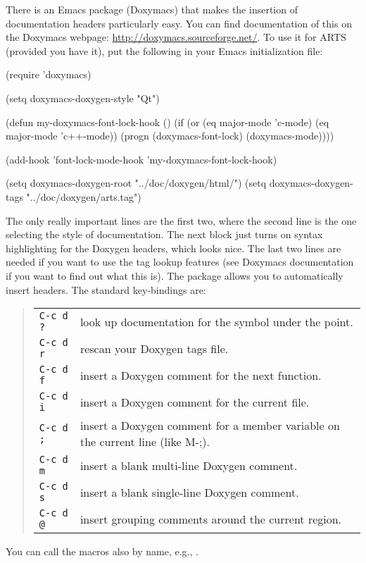 There is an Emacs package (Doxymacs) that makes the insertion of
documentation headers particularly easy. You can find documentation of
this on the Doxymacs webpage: \url{http://doxymacs.sourceforge.net/}.
To use it for ARTS (provided you have it), put the following in your
Emacs initialization file:

\begin{code}
(require 'doxymacs)

(setq doxymacs-doxygen-style "Qt")

(defun my-doxymacs-font-lock-hook ()
  (if (or (eq major-mode 'c-mode) (eq major-mode 'c++-mode))
      (progn
        (doxymacs-font-lock)
        (doxymacs-mode))))

(add-hook 'font-lock-mode-hook 'my-doxymacs-font-lock-hook)

(setq doxymacs-doxygen-root "../doc/doxygen/html/")
(setq doxymacs-doxygen-tags "../doc/doxygen/arts.tag")
\end{code}

The only really important lines are the first two, where the second
line is the one selecting the style of documentation. The next block
just turns on syntax highlighting for the Doxygen headers, which looks
nice. The last two lines are needed if you want to use the tag lookup
features (see Doxymacs documentation if you want to find out what this
is).  The package allows you to automatically insert headers. The
standard key-bindings are:
\begin{quote}
\begin{tabularx}{.8\hsize}{@{}lX}
\texttt{C-c d ?} & look up documentation for the symbol under the point.\\
\texttt{C-c d r} & rescan your Doxygen tags file.\\
\texttt{C-c d f} & insert a Doxygen comment for the next function.\\
\texttt{C-c d i} & insert a Doxygen comment for the current file.\\
\texttt{C-c d ;} & insert a Doxygen comment for a member variable on the current line (like M-;).\\
\texttt{C-c d m} & insert a blank multi-line Doxygen comment.\\
\texttt{C-c d s} & insert a blank single-line Doxygen comment.\\
\texttt{C-c d @} & insert grouping comments around the current region.\\
\end{tabularx}
\end{quote}
You can call the macros also by name, e.g., .

